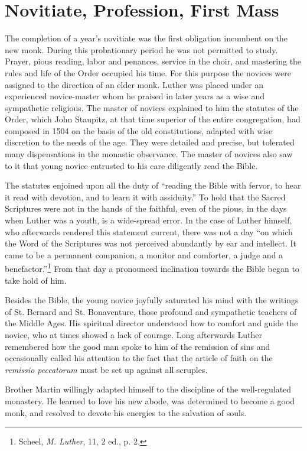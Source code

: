 \section{Novitiate, Profession, First Mass}
The completion of a year’s novitiate was the first obligation incumbent
on the new monk. During this probationary period he was
not permitted to study. Prayer, pious reading, labor and penances,
service in the choir, and mastering the rules and life of the Order
occupied his time. For this purpose the novices were assigned to the
direction of an elder monk. Luther was placed under an experienced
novice-master whom he praised in later years
as a wise and sympathetic religious. The master of novices explained
to him the statutes of the Order, which John Staupitz, at that time
superior of the entire congregation, had composed in 1504
on the basis of the old constitutions, adapted with wise discretion to
the needs of the age. They were detailed and precise, but tolerated many
dispensations in the monastic observance. The master of novices also saw to it that
young novice entrusted to his care diligently read the Bible.

The statutes enjoined upon all the duty of
“reading the Bible with fervor, to hear it read with devotion, and to learn it with assiduity.”
To hold that the Sacred Scriptures were not in the hands of the faithful, even of the pious, in the days
when Luther was a youth, is a wide-spread error. In the case of Luther himself, who afterwards
rendered this statement current, there was not a day “on which the Word of the Scriptures was not
perceived abundantly by ear and intellect. It came to be a permanent companion,
a monitor and comforter, a judge and a benefactor.”\footnote{Scheel, \textit{M. Luther}, 11, 2 ed., p. 2.}
From that day a pronounced inclination towards the Bible began to take hold of him.

Besides the Bible, the young novice joyfully saturated his mind
with the writings of St. Bernard
and St. Bonaventure, those profound and sympathetic teachers of
the Middle Ages. His spiritual director understood how to comfort and guide the novice, who at
times showed a lack of courage. Long afterwards Luther remembered
how the good man spoke to him of the remission of sins and occasionally
called his attention to the fact that the article of faith on the
\textit{remissio peccatorum} must be set up against all scruples.

Brother Martin willingly adapted himself to the discipline of the
well-regulated monastery. He learned to love his new abode, was
determined to become a good monk, and resolved to devote his
energies to the salvation of souls.

